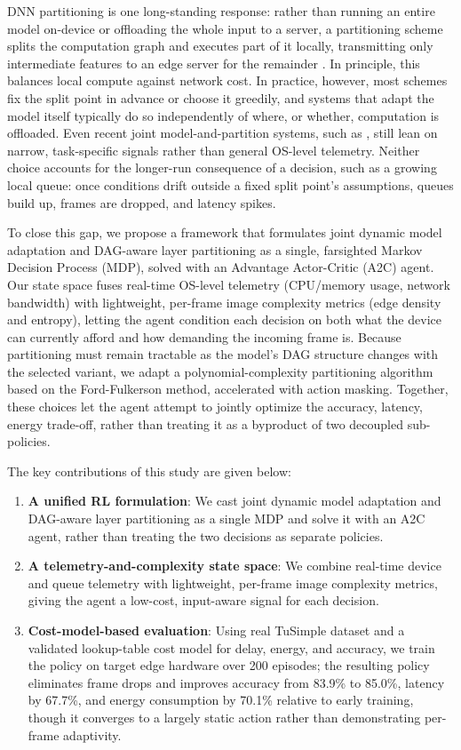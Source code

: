 \documentclass[conference]{IEEEtran}
\begin{document}
DNN partitioning is one long-standing response: rather than running an entire model on-device or offloading the whole input to a server, a partitioning scheme splits the computation graph and executes part of it locally, transmitting only intermediate features to an edge server for the remainder \cite{kang2017neurosurgeon}. In principle, this balances local compute against network cost. In practice, however, most schemes fix the split point in advance or choose it greedily, and systems that adapt the model itself typically do so independently of where, or whether, computation is offloaded. Even recent joint model-and-partition systems, such as \citet{liu2025eadi}, still lean on narrow, task-specific signals rather than general OS-level telemetry. Neither choice accounts for the longer-run consequence of a decision, such as a growing local queue: once conditions drift outside a fixed split point's assumptions, queues build up, frames are dropped, and latency spikes.

To close this gap, we propose a framework that formulates joint dynamic model adaptation and DAG-aware layer partitioning as a single, farsighted Markov Decision Process (MDP), solved with an Advantage Actor-Critic (A2C) agent. Our state space fuses real-time OS-level telemetry (CPU/memory usage, network bandwidth) with lightweight, per-frame image complexity metrics (edge density and entropy), letting the agent condition each decision on both what the device can currently afford and how demanding the incoming frame is. Because partitioning must remain tractable as the model's DAG structure changes with the selected variant, we adapt a polynomial-complexity partitioning algorithm based on the Ford-Fulkerson method, accelerated with action masking. Together, these choices let the agent attempt to jointly optimize the accuracy, latency, energy trade-off, rather than treating it as a byproduct of two decoupled sub-policies.

The key contributions of this study are given below:
\begin{enumerate}
    \item \textbf{A unified RL formulation}: We cast joint dynamic model adaptation and DAG-aware layer partitioning as a single MDP and solve it with an A2C agent, rather than treating the two decisions as separate policies.
    \item \textbf{A telemetry-and-complexity state space}: We combine real-time device and queue telemetry with lightweight, per-frame image complexity metrics, giving the agent a low-cost, input-aware signal for each decision.
    \item \textbf{Cost-model-based evaluation}: Using real TuSimple dataset and a validated lookup-table cost model for delay, energy, and accuracy, we train the policy on target edge hardware over 200 episodes; the resulting policy eliminates frame drops and improves accuracy from 83.9\% to 85.0\%, latency by 67.7\%, and energy consumption by 70.1\% relative to early training, though it converges to a largely static action rather than demonstrating per-frame adaptivity.
\end{enumerate}
\end{document}
